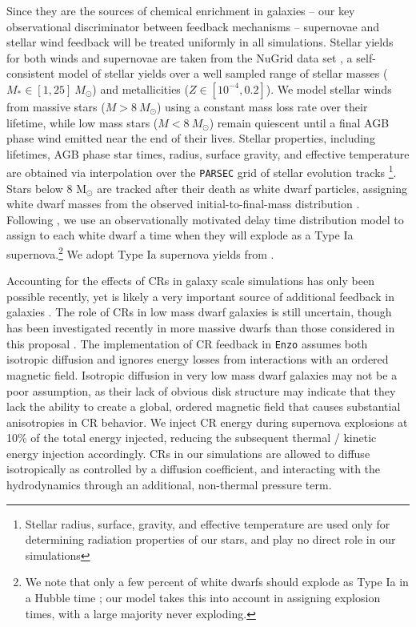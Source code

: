 \documentclass[11pt]{article}
\newcommand{\eg}{e.g.,}
\begin{document}
Since they are the sources of chemical enrichment in galaxies -- our key observational discriminator between feedback mechanisms -- supernovae and stellar wind feedback will be treated uniformly in all simulations. Stellar yields for both winds and supernovae are taken from the NuGrid data set \citep[][, Ritter et. al. in prep]{Pignatari2016}, a self-consistent model of stellar yields over a well sampled range of stellar masses ($M_{*} \in [1,25]~M_{\odot}$) and metallicities ($Z\in [10^{-4},0.2]$). We model stellar winds from massive stars ($M > 8~M_{\odot}$) using a constant mass loss rate over their lifetime, while low mass stars ($M < 8~M_{\odot}$) remain quiescent until a final AGB phase wind emitted near the end of their lives. Stellar properties, including lifetimes,  AGB phase star times, radius, surface gravity, and effective temperature are obtained via interpolation over the \texttt{PARSEC} grid of stellar evolution tracks \citep{Bressan2012}\footnote{Stellar radius, surface, gravity, and effective temperature are used only for determining radiation properties of our stars, and play no direct role in our simulations}. Stars below 8 M$_{\odot}$ are tracked after their death as white dwarf particles, assigning white dwarf masses from the observed initial-to-final-mass distribution \citep{Salaris2009}. Following \citep{Cote2015}, we use an observationally motivated delay time distribution model \citep[\eg][]{Maoz2014} to assign to each white dwarf a time when they will explode as a Type Ia supernova.\footnote{We note that only a few percent of white dwarfs should explode as Type Ia in a Hubble time \citep{Maoz2014}; our model takes this into account in assigning explosion times, with a large majority never exploding.} We adopt Type Ia supernova yields from \cite{Thielemann1986}.

Accounting for the effects of CRs in galaxy scale simulations has only been possible recently, yet is likely a very important source of additional feedback in galaxies \citep[\eg][]{SalemBryan2014, SalemBryanHummels, SalemBryanCorlies, GirichidisCR, Pakmor2016, Simpson2016}. The role of CRs in low mass dwarf galaxies is still uncertain, though has been investigated recently in more massive dwarfs than those considered in this proposal \citep{Chen2016}. The implementation of CR feedback in \texttt{Enzo} \citep{SalemBryan2014} assumes both isotropic diffusion and ignores energy losses from interactions with an ordered magnetic field. Isotropic diffusion in very low mass dwarf galaxies may not be a poor assumption, as their lack of obvious disk structure may indicate that they lack the ability to create a global, ordered magnetic field that causes substantial anisotropies in CR behavior. We inject CR energy during supernova explosions at 10\% of the total energy injected, reducing the subsequent thermal / kinetic energy injection accordingly. CRs in our simulations are allowed to diffuse isotropically as controlled by a diffusion coefficient, and interacting with the hydrodynamics through an additional, non-thermal pressure term.
\end{document}

